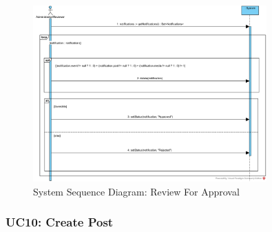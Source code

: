 \documentclass{article}
\begin{document}
\begin{figure}[H]
    \centering
    \includegraphics[width=0.8\textwidth]{images/SSD-UC09-ReviewForApproval.png}
    \centering
    \caption{System Sequence Diagram: Review For Approval}
\end{figure}
\subsubsection{UC10: Create Post}
\end{document}
